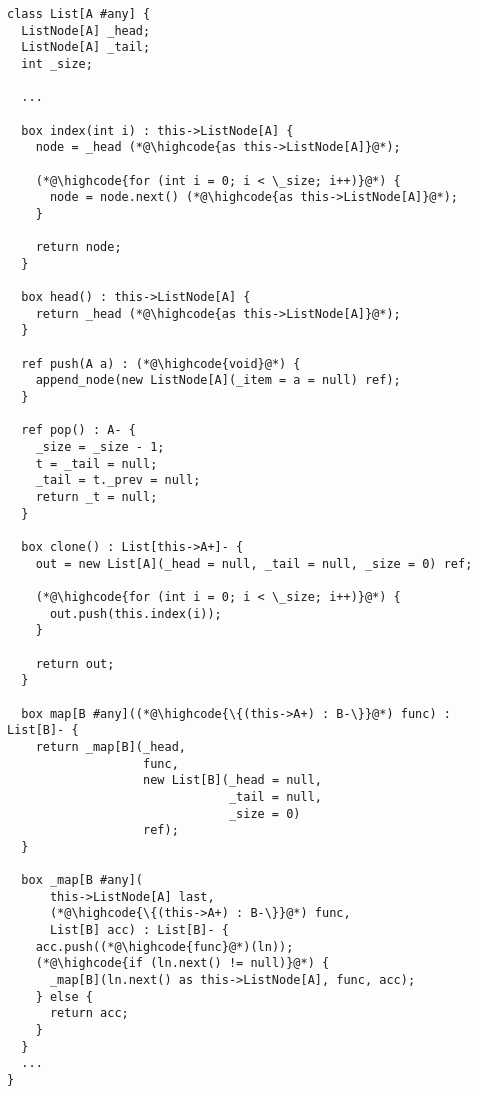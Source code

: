 \begin{lstlisting}
class List[A #any] {
  ListNode[A] _head;
  ListNode[A] _tail;
  int _size;
  
  ...

  box index(int i) : this->ListNode[A] {
    node = _head (*@\highcode{as this->ListNode[A]}@*);
    
    (*@\highcode{for (int i = 0; i < \_size; i++)}@*) {
      node = node.next() (*@\highcode{as this->ListNode[A]}@*);
    }
    
    return node;
  }
  
  box head() : this->ListNode[A] {
    return _head (*@\highcode{as this->ListNode[A]}@*);
  }
  
  ref push(A a) : (*@\highcode{void}@*) {
    append_node(new ListNode[A](_item = a = null) ref);
  }
  
  ref pop() : A- {
    _size = _size - 1;
    t = _tail = null;
    _tail = t._prev = null;
    return _t = null;
  }
  
  box clone() : List[this->A+]- {
    out = new List[A](_head = null, _tail = null, _size = 0) ref;
    
    (*@\highcode{for (int i = 0; i < \_size; i++)}@*) {
      out.push(this.index(i));
    }
    
    return out;
  }
  
  box map[B #any]((*@\highcode{\{(this->A+) : B-\}}@*) func) : List[B]- {
    return _map[B](_head, 
                   func, 
                   new List[B](_head = null,
                               _tail = null,
                               _size = 0) 
                   ref);
  }

  box _map[B #any](
      this->ListNode[A] last, 
      (*@\highcode{\{(this->A+) : B-\}}@*) func, 
      List[B] acc) : List[B]- {
    acc.push((*@\highcode{func}@*)(ln));
    (*@\highcode{if (ln.next() != null)}@*) {
      _map[B](ln.next() as this->ListNode[A], func, acc);
    } else {
      return acc;
    }
  }
  ...
}

\end{lstlisting}

